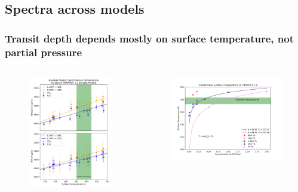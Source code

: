 \documentclass{beamer}
\begin{document}
\subsection{Spectra across models}
\begin{frame}
    \frametitle{Transit depth depends mostly on surface temperature, not partial
    pressure}
    \begin{columns}
        \begin{figure}
            \includegraphics[width=\textwidth]{spectra/depth_from_temp.png}
        \end{figure}
        \begin{figure}
            \includegraphics[width=\textwidth]{models/surfacet_co2.png}

\end{figure}
\end{columns}
\end{frame}
\end{document}
